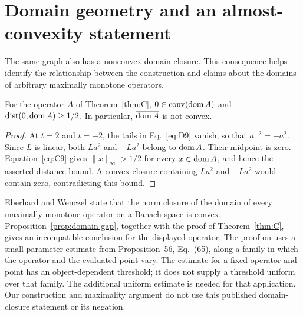 \section{Domain geometry and an almost-convexity statement}
\label{sec:domain-comparison}
The same graph also has a nonconvex domain closure. This consequence
helps identify the relationship between the construction and claims
about the domains of arbitrary maximally monotone operators.

\begin{proposition}\label{prop:domain-gap}
For the operator $A$ of Theorem~\ref{thm:C},
$0\in\operatorname{conv}(\operatorname{dom} A)$ and
$\operatorname{dist}(0,\operatorname{dom} A)\ge1/2$.
In particular, $\overline{\operatorname{dom} A}$ is not convex.
\end{proposition}
\begin{proof}
At $t=2$ and $t=-2$, the tails in Eq.~\eqref{eq:D9} vanish, so that
$a^{-2}=-a^2$. Since $L$ is linear, both $La^2$ and $-La^2$ belong
to $\operatorname{dom} A$. Their midpoint is zero. Equation~\eqref{eq:C9} gives
$\|x\|_\infty>1/2$ for every $x\in\operatorname{dom} A$, and hence the asserted
distance bound. A convex closure containing $La^2$ and $-La^2$ would
contain zero, contradicting this bound.
\end{proof}

Eberhard and Wenczel \cite[Theorem~57]{eberhardwenczel2024} state that
the norm closure of the domain of every maximally monotone operator on
a Banach space is convex. Proposition~\ref{prop:domain-gap}, together
with the proof of Theorem~\ref{thm:C}, gives an incompatible
conclusion for the displayed operator. The proof on
\cite[pp.~39--40]{eberhardwenczel2024} uses a small-parameter estimate
from Proposition~56, Eq.~(65), along a family in which the operator and
the evaluated point vary. The estimate for a fixed operator and point
has an object-dependent threshold; it does not supply a threshold
uniform over that family. The additional uniform estimate is needed
for that application. Our construction and maximality argument do not
use this published domain-closure statement or its negation.

